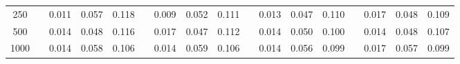 % 
\begin{tabular}{ccccccccccccccccc}
  \hline
  \hline
250 &  & 0.011 & 0.057 & 0.118 &  & 0.009 & 0.052 & 0.111 &  & 0.013 & 0.047 & 0.110 &  & 0.017 & 0.048 & 0.109 \\ 
  500 &  & 0.014 & 0.048 & 0.116 &  & 0.017 & 0.047 & 0.112 &  & 0.014 & 0.050 & 0.100 &  & 0.014 & 0.048 & 0.107 \\ 
  1000 &  & 0.014 & 0.058 & 0.106 &  & 0.014 & 0.059 & 0.106 &  & 0.014 & 0.056 & 0.099 &  & 0.017 & 0.057 & 0.099 \\ 
   \hline
\end{tabular}

